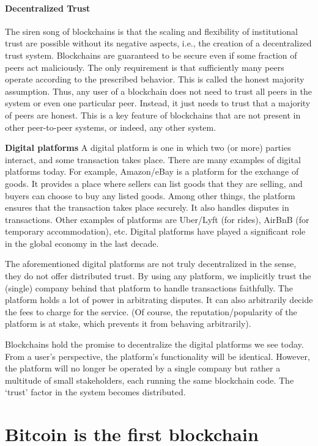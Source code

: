 \documentclass{article}
\begin{document}
\paragraph{Decentralized Trust} The siren song of blockchains is that the scaling and flexibility of institutional trust are possible without its negative aspects, i.e., the creation of a decentralized trust system. Blockchains are guaranteed to be secure even if some fraction of peers act maliciously. The only requirement is that sufficiently many peers operate according to the prescribed behavior. This is called the honest majority assumption. Thus, any user of a blockchain does not need to trust all peers in the system or even one particular peer. Instead, it just needs to trust that a majority of peers are honest. This is a key feature of blockchains that are not present in other peer-to-peer systems, or indeed, any other system.

\textbf{Digital platforms} A digital platform is one in which two (or more) parties interact, and some transaction takes place. There are many examples of digital platforms today. For example, Amazon/eBay is a platform for the exchange of goods. It provides a place where sellers can list goods that they are selling, and buyers can choose to buy any listed goods. Among other things, the platform ensures that the transaction takes place securely. It also handles disputes in transactions. Other examples of platforms are Uber/Lyft (for rides), AirBnB (for temporary accommodation), etc. Digital platforms have played a significant role in the global economy in the last decade.

The aforementioned digital platforms are not truly decentralized in the sense, they do not offer distributed trust. By using any platform, we implicitly trust the (single) company behind that platform to handle transactions faithfully. The platform holds a lot of power in arbitrating disputes. It can also arbitrarily decide the fees to charge for the service. (Of course, the reputation/popularity of the platform is at stake, which prevents it from behaving arbitrarily). 

Blockchains hold the promise to decentralize the digital platforms we see today. From a user’s perspective, the platform’s functionality will be identical. However, the platform will no longer be operated by a single company but rather a multitude of small stakeholders, each running the same blockchain code. The ‘trust’ factor in the system becomes distributed.


\section*{Bitcoin is the first blockchain}
\end{document}
